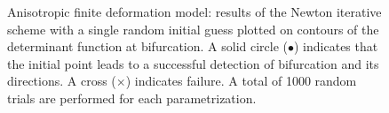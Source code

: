 \documentclass[12pt]{article}
\numberwithin{equation}{section}
\begin{document}
\begin{figure}[!htbp]
   \centering {}   
   \caption{Anisotropic finite deformation model: results of the
     Newton iterative scheme with a single random initial guess
     plotted on contours of the determinant function at
     bifurcation. A solid circle ($\bullet$) indicates that the
     initial point leads to a successful detection of bifurcation and
     its directions. A cross ($\times$) indicates failure. A total of
     1000 random trials are performed for each parametrization.}
   \label{fig:aniso-uniaxial-robust}
 \end{figure}
\end{document}
